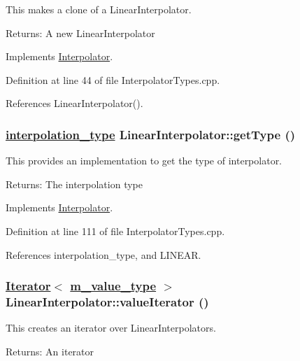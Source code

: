 This makes a clone of a Linear\-Interpolator. \begin{Desc}
\item[Returns:]A new Linear\-Interpolator \end{Desc}


Implements \hyperlink{classInterpolator_a1}{Interpolator}.

Definition at line 44 of file Interpolator\-Types.cpp.

References Linear\-Interpolator().\hypertarget{classLinearInterpolator_a3}{
\subsubsection[getType]{\setlength{\rightskip}{0pt plus 5cm}\hyperlink{Types_8h_a13}{interpolation\_\-type} Linear\-Interpolator::get\-Type ()}}
\label{classLinearInterpolator_a3}


This provides an implementation to get the type of interpolator. \begin{Desc}
\item[Returns:]The interpolation type \end{Desc}


Implements \hyperlink{classInterpolator_a6}{Interpolator}.

Definition at line 111 of file Interpolator\-Types.cpp.

References interpolation\_\-type, and LINEAR.\hypertarget{classLinearInterpolator_a2}{
\subsubsection[valueIterator]{\setlength{\rightskip}{0pt plus 5cm}\hyperlink{classIterator}{Iterator}$<$ \hyperlink{Types_8h_a3}{m\_\-value\_\-type} $>$ Linear\-Interpolator::value\-Iterator ()}}
\label{classLinearInterpolator_a2}


This creates an iterator over Linear\-Interpolators. \begin{Desc}
\item[Returns:]An iterator \end{Desc}


